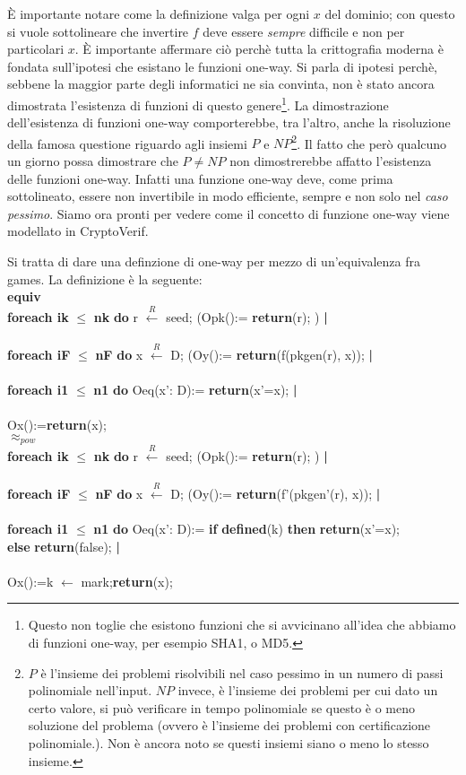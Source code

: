 \documentclass[a4paper,openright,twoside,12pt]{report}
\newcommand{\foreach}[2]{\textbf{foreach #1} $\leq$ \textbf{#2} \textbf{do}}
\newcommand{\return}[1]{\textbf{return}(#1);}
\newcommand{\pipe}{ \textbf{|} \\ \\}
\newcommand{\setR}[2]{#1 $\xleftarrow{R}$ #2;}
\newcommand{\set}[2]{#1 $\leftarrow$ #2;}
\newcommand{\ifthen}[2]{\textbf{if} #1 \textbf{then} #2}
\newcommand{\equiva}{\textbf{equiv}}
\begin{document}
\`E importante notare come la definizione valga per ogni $x$ del dominio; con questo si vuole sottolineare che invertire $f$ deve essere \emph{sempre} difficile e non per particolari $x$.
\`E importante affermare ci\`o perch\`e tutta la crittografia moderna \`e fondata sull'ipotesi che esistano le funzioni one-way.
Si parla di ipotesi perch\`e, sebbene la maggior parte degli informatici ne sia convinta, non \`e stato ancora dimostrata l'esistenza di funzioni di questo genere\footnote{Questo non toglie
che esistono funzioni che si avvicinano all'idea che abbiamo di funzioni one-way, per esempio SHA1, o MD5.}.
La dimostrazione dell'esistenza di funzioni one-way comporterebbe, tra l'altro, anche la risoluzione della famosa questione riguardo agli insiemi
$P$ e $NP$\footnote{$P$ \`e l'insieme dei problemi risolvibili nel caso pessimo in un numero di passi polinomiale nell'input. $NP$ invece, \`e l'insieme dei problemi per cui dato un certo valore, 
si pu\`o verificare in tempo polinomiale se questo \`e o meno soluzione del problema (ovvero \`e l'insieme dei problemi con certificazione polinomiale.). 
Non \`e ancora noto se questi insiemi siano o meno lo stesso insieme.}.
Il fatto che però qualcuno un giorno possa dimostrare che $P \neq NP$ non dimostrerebbe affatto l'esistenza delle funzioni one-way. 
Infatti una funzione one-way deve, come prima sottolineato, essere non invertibile in modo efficiente, sempre e non solo nel \emph{caso pessimo}. 
\newpage
Siamo ora pronti per vedere come il concetto di funzione one-way viene modellato in CryptoVerif.


Si tratta di dare una definzione di one-way per mezzo di un'equivalenza fra games. La definizione \`e la seguente:\\
\equiva \\
\foreach{ik}{nk} \setR{r}{seed} (Opk():= \return{r} )\pipe 
 \foreach{iF}{nF} \setR{x}{D} (Oy():= \return{f(pkgen(r), x)} \pipe
  \foreach{i1}{n1} Oeq(x': D):= \return{x'=x} \pipe 
    Ox():=\return{x} \\
\textbf{$\approx _{pow}$}\\
\foreach{ik}{nk} \setR{r}{seed} (Opk():= \return{r} )\pipe 
 \foreach{iF}{nF} \setR{x}{D} (Oy():= \return{f'(pkgen'(r), x)} \pipe
  \foreach{i1}{n1} Oeq(x': D):= \ifthen{\textbf{defined}(k)}{\return{x'=x}} \\ \textbf{else}  \return{false} \pipe 
    Ox():=\set{k}{mark}\return{x} \\
\end{document}
